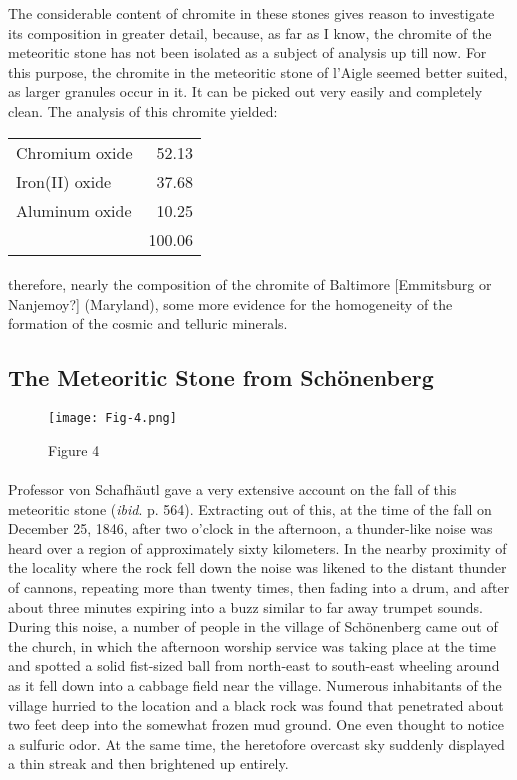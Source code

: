 \documentclass[a4paper, 12pt, oneside]{article}
\begin{document}
The considerable content of chromite in these stones gives reason to investigate its composition in greater detail, because, as far as I know, the chromite of the meteoritic stone has not been isolated as a subject of analysis up till now. For this purpose, the chromite in the meteoritic stone of l'Aigle seemed better suited, as larger granules occur in it. It can be picked out very easily and completely clean. The analysis of this chromite yielded:
\begin{center}
    \begin{tabular}{l r}
        Chromium oxide & 52.13\\
        Iron(II) oxide & 37.68\\
        Aluminum oxide & 10.25\\
         & 100.06\\
    \end{tabular}
\end{center}
\paragraph{}
therefore, nearly the composition of the chromite of Baltimore [Emmitsburg or Nanjemoy?] (Maryland), some more evidence for the homogeneity of the formation of the cosmic and telluric minerals.
\clearpage
\subsection{The Meteoritic Stone from Schönenberg}
\begin{figure}[h]
\centering
\texttt{[image: Fig-4.png]}
\caption{Figure 4}
\end{figure}
\paragraph{}
Professor von Schafhäutl gave a very extensive account on the fall of this meteoritic stone (\emph{ibid}. p. 564). Extracting out of this, at the time of the fall on December 25, 1846, after two o'clock in the afternoon, a thunder-like noise was heard over a region of approximately sixty kilometers. In the nearby proximity of the locality where the rock fell down the noise was likened to the distant thunder of cannons, repeating more than twenty times, then fading into a drum, and after about three minutes expiring into a buzz similar to far away trumpet sounds. During this noise, a number of people in the village of Schönenberg came out of the church, in which the afternoon worship service was taking place at the time and spotted a solid fist-sized ball from north-east to south-east wheeling around as it fell down into a cabbage field near the village. Numerous inhabitants of the village hurried to the location and a black rock was found that penetrated about two feet deep into the somewhat frozen mud ground. One even thought to notice a sulfuric odor. At the same time, the heretofore overcast sky suddenly displayed a thin streak and then brightened up entirely.
\end{document}
